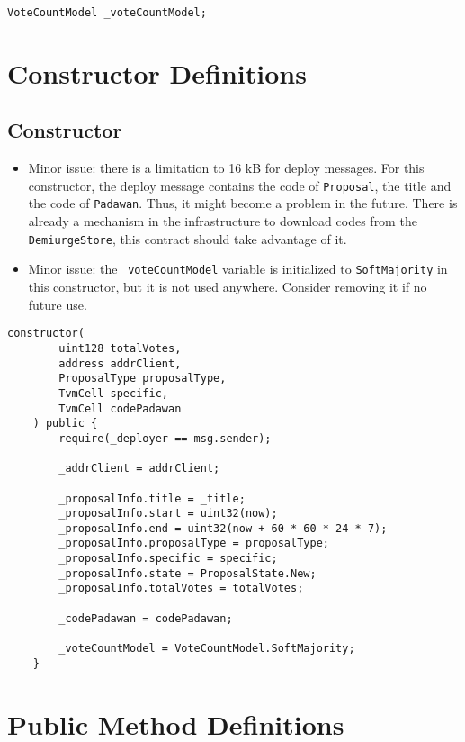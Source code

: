 \begin{lstlisting}[firstnumber=21]
    VoteCountModel _voteCountModel;
\end{lstlisting}

\section{Constructor Definitions}


\subsection{Constructor}

\begin{itemize}
\item Minor issue: there is a limitation to 16 kB for deploy
  messages. For this constructor, the deploy message contains the code
  of {\tt Proposal}, the title and the code of {\tt Padawan}. Thus, it
  might become a problem in the future. There is already a mechanism
  in the infrastructure to download codes from the {\tt
    DemiurgeStore}, this contract should take advantage of it.
\item Minor issue: the {\tt \_voteCountModel} variable is initialized
  to {\tt SoftMajority} in this constructor, but it is not used
  anywhere. Consider removing it if no future use.
\end{itemize}

\begin{lstlisting}[firstnumber=25]
    constructor(
        uint128 totalVotes,
        address addrClient,
        ProposalType proposalType,
        TvmCell specific,
        TvmCell codePadawan
    ) public {
        require(_deployer == msg.sender);

        _addrClient = addrClient;

        _proposalInfo.title = _title;
        _proposalInfo.start = uint32(now);
        _proposalInfo.end = uint32(now + 60 * 60 * 24 * 7);
        _proposalInfo.proposalType = proposalType;
        _proposalInfo.specific = specific;
        _proposalInfo.state = ProposalState.New;
        _proposalInfo.totalVotes = totalVotes;

        _codePadawan = codePadawan;

        _voteCountModel = VoteCountModel.SoftMajority;
    }
\end{lstlisting}

\section{Public Method Definitions}


